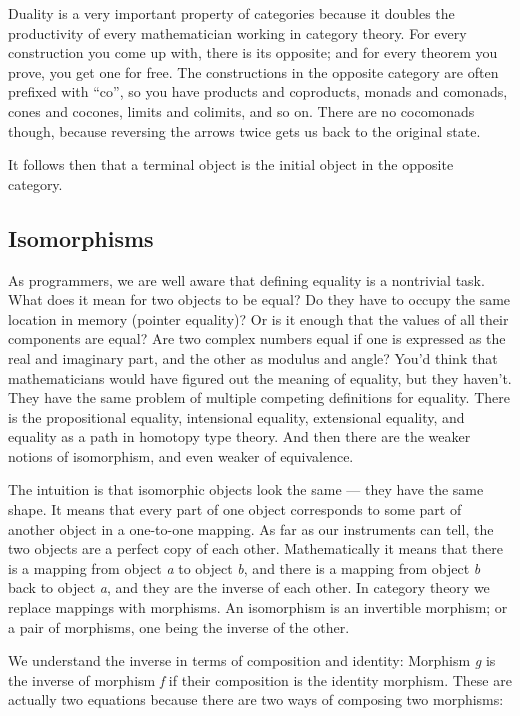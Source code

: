 Duality is a very important property of categories because it doubles
the productivity of every mathematician working in category theory. For
every construction you come up with, there is its opposite; and for
every theorem you prove, you get one for free. The constructions in the
opposite category are often prefixed with ``co'', so you have products
and coproducts, monads and comonads, cones and cocones, limits and
colimits, and so on. There are no cocomonads though, because reversing
the arrows twice gets us back to the original state.

It follows then that a terminal object is the initial object in the
opposite category.

\subsection{Isomorphisms}\label{isomorphisms}

As programmers, we are well aware that defining equality is a nontrivial
task. What does it mean for two objects to be equal? Do they have to
occupy the same location in memory (pointer equality)? Or is it enough
that the values of all their components are equal? Are two complex
numbers equal if one is expressed as the real and imaginary part, and
the other as modulus and angle? You'd think that mathematicians would
have figured out the meaning of equality, but they haven't. They have
the same problem of multiple competing definitions for equality. There
is the propositional equality, intensional equality, extensional
equality, and equality as a path in homotopy type theory. And then there
are the weaker notions of isomorphism, and even weaker of equivalence.

The intuition is that isomorphic objects look the same --- they have the
same shape. It means that every part of one object corresponds to some
part of another object in a one-to-one mapping. As far as our
instruments can tell, the two objects are a perfect copy of each other.
Mathematically it means that there is a mapping from object \emph{a} to
object \emph{b}, and there is a mapping from object \emph{b} back to
object \emph{a}, and they are the inverse of each other. In category
theory we replace mappings with morphisms. An isomorphism is an
invertible morphism; or a pair of morphisms, one being the inverse of
the other.

We understand the inverse in terms of composition and identity: Morphism
\emph{g} is the inverse of morphism \emph{f} if their composition is the
identity morphism. These are actually two equations because there are
two ways of composing two morphisms:

